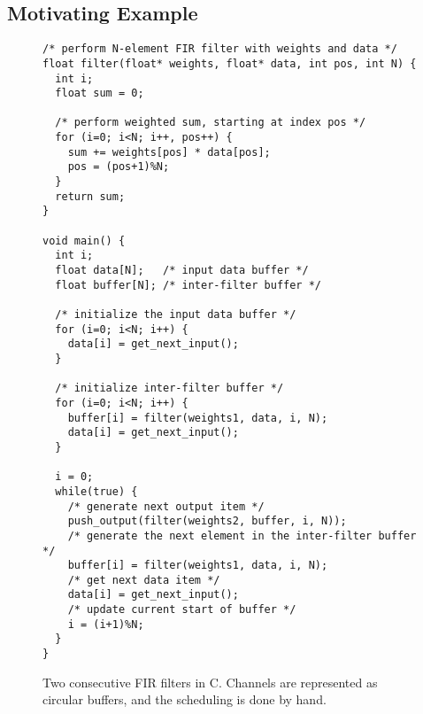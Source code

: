 \subsection{Motivating Example}
\begin{figure}[t]
\center
\epsfxsize=2.0in
\caption{Block diagram of two FIR filters.}
\vspace{11pt}
\scriptsize
\begin{verbatim}
/* perform N-element FIR filter with weights and data */
float filter(float* weights, float* data, int pos, int N) {
  int i;
  float sum = 0;

  /* perform weighted sum, starting at index pos */
  for (i=0; i<N; i++, pos++) {
    sum += weights[pos] * data[pos];
    pos = (pos+1)%N;
  }
  return sum;
}

void main() {
  int i;
  float data[N];   /* input data buffer */
  float buffer[N]; /* inter-filter buffer */
  
  /* initialize the input data buffer */
  for (i=0; i<N; i++) {
    data[i] = get_next_input();
  }
  
  /* initialize inter-filter buffer */
  for (i=0; i<N; i++) {
    buffer[i] = filter(weights1, data, i, N);
    data[i] = get_next_input();
  }
  
  i = 0;
  while(true) {
    /* generate next output item */
    push_output(filter(weights2, buffer, i, N));
    /* generate the next element in the inter-filter buffer */
    buffer[i] = filter(weights1, data, i, N);
    /* get next data item */
    data[i] = get_next_input();
    /* update current start of buffer */
    i = (i+1)%N;
  }
}
\end{verbatim}
\vspace{-18pt}
\caption{Two consecutive FIR filters in C.  Channels are represented
as circular buffers, and the scheduling is done by hand.
\protect\label{fig:motivating-example}}
\vspace{-12pt}
\end{figure}

